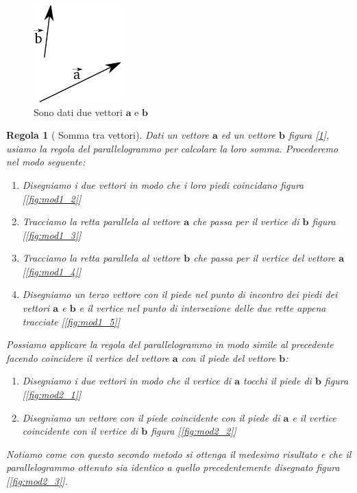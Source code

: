 \documentclass[a4paper,10pt,oneside]{article}
\newtheorem{regola}{Regola}
\begin{document}
\begin{figure}[H]
\begin{center}
 \includegraphics[width=0.3\textwidth]{./immagini/somma_mod1_1.png}
 \caption{Sono dati due vettori $\mathbf{a}$ e $\mathbf{b}$}
 \label{fig:somma_base}
\end{center}
\end{figure}

\begin{regola}[ Somma tra vettori]
Dati un vettore $\mathbf{a}$ ed un vettore $\mathbf{b}$ figura [\ref{fig:somma_base}], usiamo la regola del parallelogrammo per calcolare la loro somma. Procederemo nel modo seguente:
\begin{enumerate}
 \item Disegniamo i due vettori in modo che i loro piedi coincidano figura [\ref{fig:mod1_2}]
 \item Tracciamo la retta parallela al vettore $\mathbf{a}$ che passa per il vertice di $\mathbf{b}$ figura [\ref{fig:mod1_3}]
\item Tracciamo la retta parallela al vettore $\mathbf{b}$ che passa per il vertice del vettore $\mathbf{a}$ [\ref{fig:mod1_4}]
\item Disegniamo un terzo vettore con il piede nel punto di incontro dei piedi dei vettori $\mathbf{a}$ e $\mathbf{b}$ e il vertice nel punto di intersezione delle due rette appena tracciate [\ref{fig:mod1_5}]
\end{enumerate}
Possiamo applicare la regola del parallelogrammo in modo simile al precedente facendo coincidere il vertice del vettore $\mathbf{a}$ con il piede del vettore $\mathbf{b}$:
\begin{enumerate}
 \item Disegniamo i due vettori in modo che il vertice di  $\mathbf{a}$ tocchi il piede di $\mathbf{b}$ figura [\ref{fig:mod2_1}]
\item Disegniamo un vettore con il piede coincidente con il piede di $\mathbf{a}$ e il vertice coincidente con il vertice di $\mathbf{b}$ figura [\ref{fig:mod2_2}]
\end{enumerate}
Notiamo come con questo secondo metodo si ottenga il medesimo risultato e che il parallelogrammo ottenuto sia identico a quello precedentemente disegnato figura [\ref{fig:mod2_3}].
\end{regola}
\end{document}
